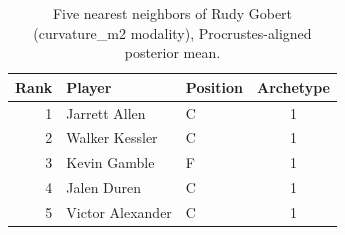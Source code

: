 \begin{table}[htbp]
  \centering\small
  \begin{tabular}{rllc}
    \toprule
    Rank & Player & Position & Archetype \\
    \midrule
    1 & Jarrett Allen & C & 1 \\
    2 & Walker Kessler & C & 1 \\
    3 & Kevin Gamble & F & 1 \\
    4 & Jalen Duren & C & 1 \\
    5 & Victor Alexander & C & 1 \\
    \bottomrule
  \end{tabular}
  \caption{Five nearest neighbors of Rudy Gobert (curvature_m2 modality), Procrustes-aligned posterior mean.}
  \label{tab:Rudy_Gobert_neighbors_curvature_m2}
\end{table}

